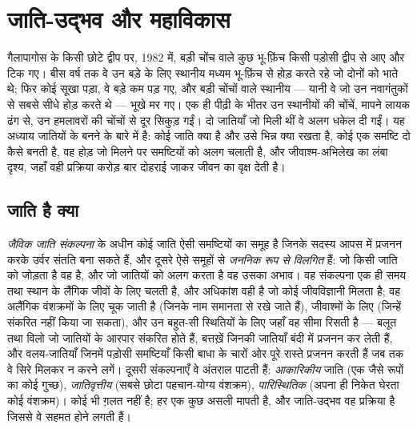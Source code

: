 \chapter{जाति-उद्भव और महाविकास}\label{ch:b2:speciation}

गैलापागोस के किसी छोटे द्वीप पर, 1982 में, बड़ी चोंच वाले कुछ
भू-फ़िंच किसी पड़ोसी द्वीप से आए और टिक गए।
बीस वर्ष तक वे उन बड़े  के लिए स्थानीय मध्यम भू-फ़िंच से
होड़ करते रहे जो दोनों को भाते थे; फिर कोई सूखा पड़ा, वे
बड़े  कम पड़ गए, और बड़ी चोंचों वाले स्थानीय ---
यानी वे जो उन नवागंतुकों से सबसे सीधे होड़ करते थे --- भूखे मर गए।
एक ही पीढ़ी के भीतर उन स्थानीयों की चोंचें, मापने लायक ढंग से, उन
हमलावरों की चोंचों से दूर सिकुड़ गईं। दो जातियाँ जो मिली थीं वे
अलग धकेल दी गईं। यह अध्याय जातियों के बनने के बारे में है: कोई जाति
क्या है और उसे भिन्न क्या रखता है, कोई एक समष्टि दो कैसे बनती है, वह
होड़ जो मिलने पर समष्टियों को अलग चलाती है, और जीवाश्म-अभिलेख का
लंबा दृश्य, जहाँ वही प्रक्रिया करोड़ बार दोहराई जाकर जीवन का वृक्ष देती है।

\section{जाति है क्या}

\begin{definition}[जाति]\label{def:b2:speciation:species}
\emph{जैविक जाति संकल्पना} के अधीन कोई जाति ऐसी समष्टियों का समूह है
जिनके सदस्य आपस में प्रजनन करके
उर्वर संतति बना सकते हैं, और दूसरे ऐसे समूहों से \emph{जननिक रूप से विलगित}
हैं: जो किसी जाति को जोड़ता है वह  है, और
जो जातियों को अलग करता है वह उसका अभाव। वह संकल्पना एक ही समय तथा स्थान के
लैंगिक जीवों के लिए चलती है, और अधिकांश वही है जो कोई
जीवविज्ञानी मिलता है; वह अलैंगिक वंशक्रमों के लिए चूक जाती है (जिनके नाम
समानता से रखे जाते हैं), जीवाश्मों के लिए (जिन्हें संकरित नहीं किया जा सकता), और उन
बहुत-सी स्थितियों के लिए जहाँ वह सीमा रिसती है --- बलूत तथा विलो जो
जातियों के आरपार संकरित होते हैं, बत्तख़ें जिनकी जातियाँ बंदी में प्रजनन कर लेती हैं,
और वलय-जातियाँ जिनमें पड़ोसी समष्टियाँ
किसी बाधा के चारों ओर पूरे रास्ते प्रजनन करती हैं जब तक वे सिरे मिलकर
न करने लगें। दूसरी संकल्पनाएँ वे अंतराल पाटती हैं: \emph{आकारिकीय} जाति
(एक जैसे रूपों का कोई गुच्छ), \emph{जातिवृत्तीय} (सबसे छोटा
पहचान-योग्य वंशक्रम), \emph{पारिस्थितिक} (अपना ही निकेत घेरता कोई
वंशक्रम)। कोई भी ग़लत नहीं है; हर एक कुछ असली मापती है, और
जाति-उद्भव वह प्रक्रिया है जिससे वे सहमत होने लगती हैं।
\end{definition}

